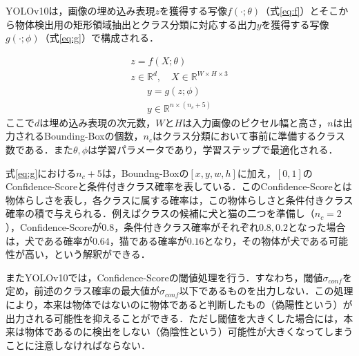     YOLOv10は，画像の埋め込み表現$z$を獲得する写像$f(\cdot ; \theta)$（式\ref{eq:f}）とそこから物体検出用の矩形領域抽出とクラス分類に対応する出力$y$を獲得する写像$g(\cdot ; \phi)$（式\ref{eq:g}）で構成される．

    \begin{equation}
        \label{eq:f}
        \begin{gathered}
            z = f(X; \theta)
            \\ z \in \mathbb{R}^d, \quad X \in \mathbb{R}^{W \times H \times 3}
        \end{gathered}
    \end{equation}
    \begin{equation}
        \label{eq:g}
        \begin{gathered}
            y = g(z; \phi)
            \\ y \in \mathbb{R}^{n \times \left(n_c + 5\right)}
        \end{gathered}
    \end{equation}
    ここで$d$は埋め込み表現の次元数，$W$と$H$は入力画像のピクセル幅と高さ，$n$は出力されるBounding-Boxの個数，$n_c$はクラス分類において事前に準備するクラス数である．また$\theta, \phi$は学習パラメータであり，学習ステップで最適化される．
    \par
    式\ref{eq:g}における$n_c + 5$は，Boundng-Boxの$\left[x, y, w, h\right]$に加え，$[0,1]$のConfidence-Scoreと条件付きクラス確率を表している．このConfidence-Scoreとは物体らしさを表し，各クラスに属する確率は，この物体らしさと条件付きクラス確率の積で与えられる．例えばクラスの候補に犬と猫の二つを準備し（$n_c=2$），Confidence-Scoreが$0.8$，条件付きクラス確率がそれぞれ$0.8, 0.2$となった場合は，犬である確率が$0.64$，猫である確率が$0.16$となり，その物体が犬である可能性が高い，という解釈ができる．
    \par
    またYOLOv10では，Confidence-Scoreの閾値処理を行う．すなわち，閾値$\sigma_{conf}$を定め，前述のクラス確率の最大値が$\sigma_{conf}$以下であるものを出力しない．この処理により，本来は物体ではないのに物体であると判断したもの（偽陽性という）が出力される可能性を抑えることができる．ただし閾値を大きくした場合には，本来は物体であるのに検出をしない（偽陰性という）可能性が大きくなってしまうことに注意しなければならない．
    \par
